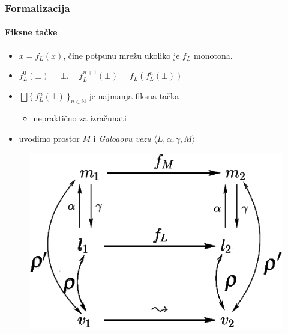 \documentclass[xetex,mathserif,serif]{beamer}
\begin{document}
  \begin{frame}
    \frametitle{Formalizacija}
    \framesubtitle{Fiksne tačke}
	\begin{center}
		\begin{itemize}
			\item $x = f_{L}(x)$, \pause čine potpunu mrežu ukoliko je $f_{L}$ monotona.\pause
			\item $f^{0}_{L}(\bot) = \bot, \quad f^{n+1}_{L}(\bot) = f_{L}(f^{n}_{L}(\bot))$ \pause
			\item $\bigsqcup \{ \: f^{n}_{L}(\bot)\: \}_{n \in \mathbb{N}}$ je najmanja fiksna tačka \pause
			\begin{itemize}
				\item {\color{red} nepraktično za izračunati }			\pause
			\end{itemize}
			\item uvodimo prostor $M$ i \emph{Galoaovu vezu}  $\langle L, \alpha, \gamma, M \rangle$
		\end{itemize}
		\begin{figure}
			\includegraphics[scale=0.3,left]{Rho_prime.png}
		\end{figure}
		\end{center}
  \end{frame}
\end{document}
